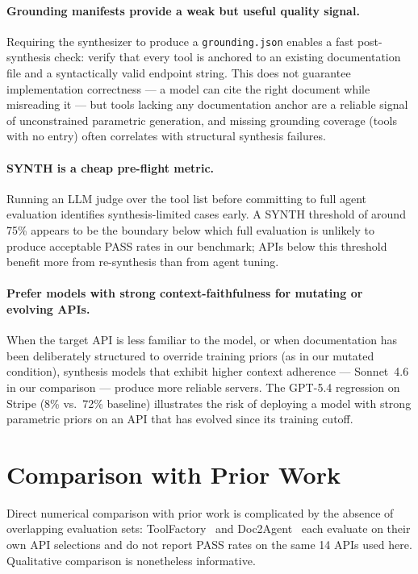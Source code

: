 \documentclass[12pt]{report}
\begin{document}
\paragraph{Grounding manifests provide a weak but useful quality signal.}
Requiring the synthesizer to produce a \texttt{grounding.json} enables a
fast post-synthesis check: verify that every tool is anchored to an existing
documentation file and a syntactically valid endpoint string. This does not
guarantee implementation correctness --- a model can cite the right document
while misreading it --- but tools lacking any documentation anchor are a
reliable signal of unconstrained parametric generation, and missing grounding
coverage (tools with no entry) often correlates with structural synthesis
failures.

\paragraph{SYNTH is a cheap pre-flight metric.}
Running an LLM judge over the tool list before committing to full agent
evaluation identifies synthesis-limited cases early. A SYNTH threshold
of around 75\% appears to be the boundary below which full evaluation
is unlikely to produce acceptable PASS rates in our benchmark; APIs
below this threshold benefit more from re-synthesis than from agent
tuning.

\paragraph{Prefer models with strong context-faithfulness for mutating or
evolving APIs.}
When the target API is less familiar to the model, or when documentation
has been deliberately structured to override training priors (as in our
mutated condition), synthesis models that exhibit higher context adherence
--- Sonnet~4.6 in our comparison --- produce more reliable servers. The
GPT-5.4 regression on Stripe (8\% vs.\ 72\% baseline) illustrates the risk
of deploying a model with strong parametric priors on an API that has
evolved since its training cutoff.

\section{Comparison with Prior Work}

Direct numerical comparison with prior work is complicated by the absence of
overlapping evaluation sets: ToolFactory~\cite{toolfactory2025} and
Doc2Agent~\cite{doc2agent2025} each evaluate on their own API selections
and do not report PASS rates on the same 14 APIs used here. Qualitative
comparison is nonetheless informative.
\end{document}
